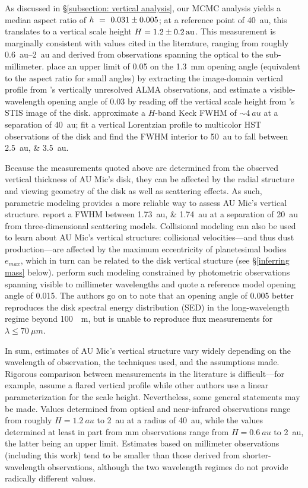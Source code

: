 \documentclass[modern]{aastex62}
\begin{document}
As discussed in \S \ref{subsection: vertical analysis}, our MCMC analysis yields a median aspect ratio of $h~=~\num{0.031 \pm 0.005}$; at a reference point of \SI{40}{au}, this translates to a vertical scale height $H = \SI{1.2 \pm 0.2}{au}$.
This measurement is marginally consistent with values cited in the literature, ranging from roughly \SIrange{0.6}{2}{au} and derived from observations spanning the optical to the sub-millimeter.
\cite{schuppler17} place an upper limit of 0.05 on the \SI{1.3}{mm} opening angle (equivalent to the aspect ratio for small angles) by extracting the image-domain vertical profile from \cite{macgregor13}'s vertically unresolved ALMA observations, and estimate a visible-wavelength opening angle of 0.03 by reading off the vertical scale height from \cite{schneider14}'s STIS image of the disk.
\cite{metchev05} approximate a $H$-band Keck FWHM of $\sim \SI{4}{au}$ at a separation of \SI{40}{au};
\cite{krist05} fit a vertical Lorentzian profile to multicolor HST observations of the disk and find the FWHM interior to \SI{50}{au} to fall between \SIlist{2.5;3.5}{au}.

Because the measurements quoted above are determined from the observed vertical thickness of AU Mic's disk, they can be affected by the radial structure and viewing geometry of the disk as well as scattering effects. 
As such, parametric modeling provides a more reliable way to assess AU Mic's vertical structure.
\cite{krist05} report a FWHM between \SIlist{1.73;1.74}{au} at a separation of \SI{20}{au} from three-dimensional scattering models.
Collisional modeling can also be used to learn about AU Mic's vertical structure: collisional velocities---and thus dust production---are affected by the maximum eccentricity of planetesimal bodies $e_{max}$, which in turn can be related to the disk vertical stucture (see \S \ref{inferring mass} below). 
\cite{schuppler17} perform such modeling constrained by photometric observations spanning visible to millimeter wavelengths and quote a reference model opening angle of 0.015.
The authors go on to note that an opening angle of 0.005 better reproduces the disk spectral energy distribution (SED) in the long-wavelength regime beyond \SI{100}{\mu m}, but is unable to reproduce flux measurements for $\lambda \leq \SI{70}{\mu m}$.

In sum, estimates of AU Mic's vertical structure vary widely depending on the wavelength of observation, the techniques used, and the assumptions made.
Rigorous comparison between measurements in the literature is difficult---for example, \cite{krist05} assume a flared vertical profile while other authors use a linear parameterization for the scale height.
Nevertheless, some general statements may be made.
Values determined from optical and near-infrared observations range from roughly $H = \SI{1.2}{au}$ to \SI{2}{au} at a radius of \SI{40}{au}, while the values determined at least in part from mm observations range from $H = \SI{0.6}{au}$ to \SI{2}{au}, the latter being an upper limit. 
Estimates based on millimeter observations (including this work) tend to be smaller than those derived from shorter-wavelength observations, although the two wavelength regimes do not provide radically different values.
\end{document}

